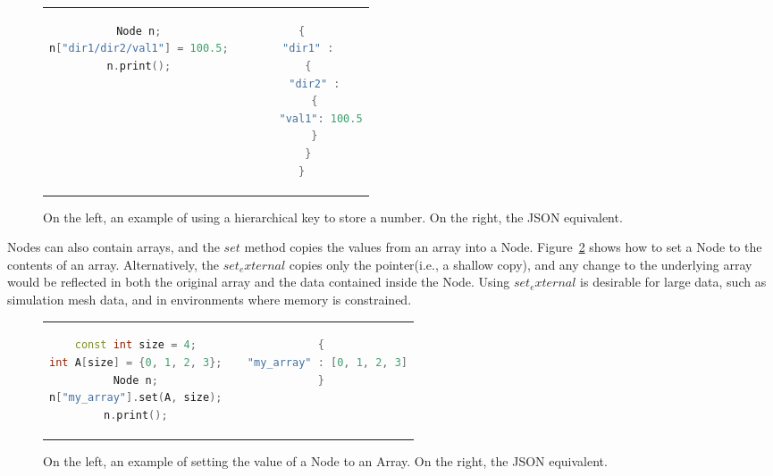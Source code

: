 \begin{figure}
\begin{tabular}{cc}
  \begin{minipage}{.5\textwidth}
  \centering
    \begin{lstlisting}[language=C++]
Node n;
n["dir1/dir2/val1"] = 100.5;
n.print();
    \end{lstlisting}
  \end{minipage}
  &
  \begin{minipage}{.5\textwidth}
  \centering
  \begin{lstlisting}[language=C++]
{
  "dir1" :
  {
    "dir2" :
    {
      "val1": 100.5
    }
  }
}
  \end{lstlisting}
  \end{minipage}
\end{tabular}
\caption{\label{ex:2}On the left, an example of using a hierarchical key to store a number. On the right, the JSON equivalent.}
\end{figure}

Nodes can also contain arrays, and the $set$ method
copies the values from an array into a Node.
%
Figure~\ref{ex:3} shows how to set a Node to the contents of an array.
%
Alternatively, the $set_external$ copies only the pointer(i.e., a shallow copy),
and any change to the underlying array would be reflected in both the original
array and the data contained inside the Node.
%
Using $set_external$ is desirable for large data, such as simulation mesh data,
and in environments where memory is constrained.

\begin{figure}
\begin{tabular}{cc}
  \begin{minipage}{.5\textwidth}
  \centering
    \begin{lstlisting}[language=C++]
const int size = 4;
int A[size] = {0, 1, 2, 3};
Node n;
n["my_array"].set(A, size);
n.print();
    \end{lstlisting}
  \end{minipage}
  &
  \begin{minipage}{.5\textwidth}
  \centering
  \begin{lstlisting}[language=C++]
{
  "my_array" : [0, 1, 2, 3]
}
  \end{lstlisting}
  \end{minipage}
\end{tabular}

\caption{\label{ex:3}On the left, an example of setting the value of a Node to an Array. On the right, the JSON equivalent.}
\end{figure}

